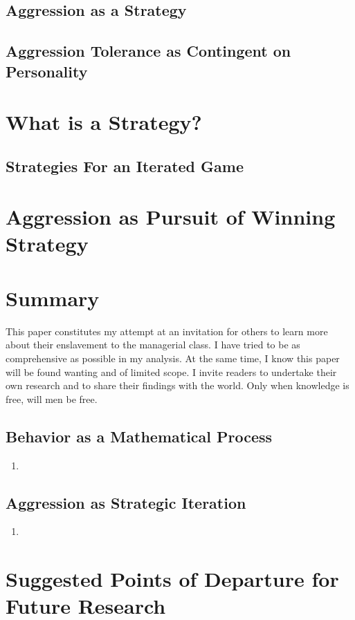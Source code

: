 \documentclass[12pt]{article}
\begin{document}
\subsection{Aggression as a Strategy}
\subsection{Aggression Tolerance as Contingent on Personality}

\section{What is a Strategy?}
\subsection{Strategies For an Iterated Game}

\section{Aggression as Pursuit of Winning Strategy}

\section{Summary}
This paper constitutes my attempt at an invitation for others to learn more about their enslavement to the managerial class.
I have tried to be as comprehensive as possible in my analysis.
At the same time, I know this paper will be found wanting and of limited scope.
I invite readers to undertake their own research and to share their findings with the world.
Only when knowledge is free, will men be free.

\subsection{Behavior as a Mathematical Process}
\begin{enumerate}
    \item 
\end{enumerate}
\subsection{Aggression as Strategic Iteration}
\begin{enumerate}
    \item 
\end{enumerate}

\section{Suggested Points of Departure for Future Research}
\end{document}
